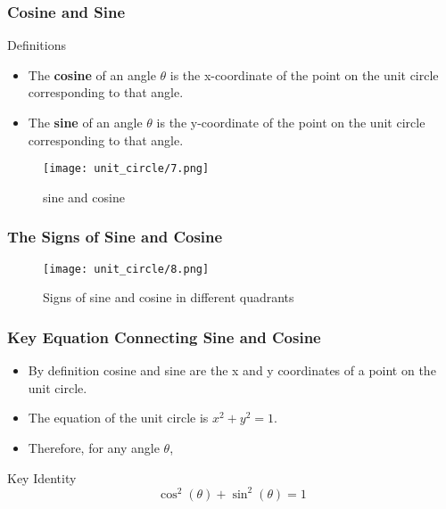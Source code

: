 \begin{frame}
    \frametitle{Cosine and Sine}
    \begin{block}{Definitions}
        \begin{itemize}
            \item The \textbf{cosine} of an angle $\theta$ is the x-coordinate of the point on the unit circle corresponding to that angle.
            \item The \textbf{sine} of an angle $\theta$ is the y-coordinate of the point on the unit circle corresponding to that angle.
        \end{itemize}
    \end{block}     
    \begin{figure}[h]    
        \begin{minipage}[b]{0.8\textwidth}
            \centering
            \texttt{[image: unit\_circle/7.png]}
            \caption{sine and cosine}
        \end{minipage}
    \end{figure}
\end{frame}

\begin{frame}
    \frametitle{The Signs of Sine and Cosine} 
    \begin{figure}
        \centering
        \texttt{[image: unit\_circle/8.png]}
        \caption{Signs of sine and cosine in different quadrants}
    \end{figure}
\end{frame}

\begin{frame}
    \frametitle{Key Equation Connecting Sine and Cosine} 
    \begin{itemize}
        \item By definition cosine and sine are the x and y coordinates of a point on the unit circle.
        \item The equation of the unit circle is $x^2 + y^2 = 1$.
        \item Therefore, for any angle $\theta$,
    \end{itemize}
    \begin{block}{Key Identity}
        \[\cos^2(\theta) + \sin^2(\theta) = 1\]
    \end{block}
\end{frame}

